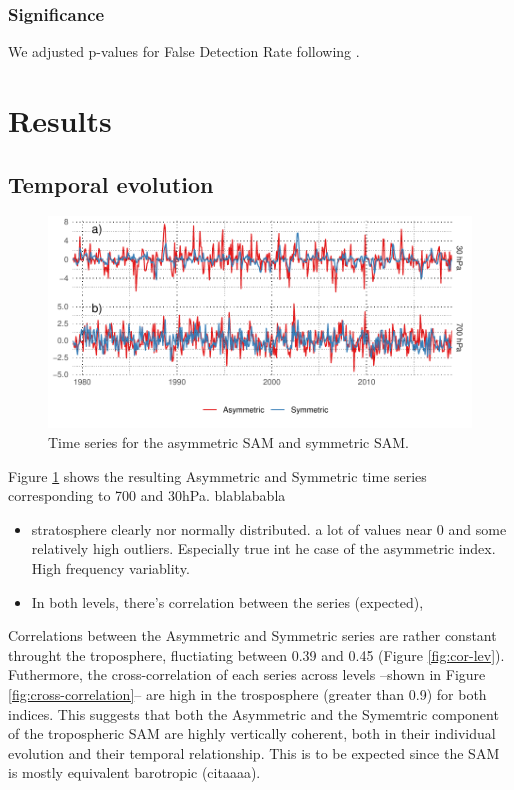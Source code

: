 \documentclass[]{ametsocV5}
\begin{document}
\subsubsection{Significance}

We adjusted p-values for False Detection Rate following
\citet{wilks2016}.

\section{Results}

\subsection{Temporal evolution}

\begin{figure}
\includegraphics{asymsam-timeseries-1} \caption[Time series for the asymmetric SAM and symmetric SAM]{Time series for the asymmetric SAM and symmetric SAM.}\label{fig:asymsam-timeseries}
\end{figure}

Figure \ref{fig:asymsam-timeseries} shows the resulting Asymmetric and
Symmetric time series corresponding to 700 and 30hPa. blablababla

\begin{itemize}
\item
  stratosphere clearly nor normally distributed. a lot of values near 0
  and some relatively high outliers. Especially true int he case of the
  asymmetric index. High frequency variablity.
\item
  In both levels, there's correlation between the series (expected),
\end{itemize}

Correlations between the Asymmetric and Symmetric series are rather
constant throught the troposphere, fluctiating between 0.39 and 0.45
(Figure \ref{fig:cor-lev}). Futhermore, the cross-correlation of each
series across levels --shown in Figure \ref{fig:cross-correlation}-- are
high in the trosposphere (greater than 0.9) for both indices. This
suggests that both the Asymmetric and the Symemtric component of the
tropospheric SAM are highly vertically coherent, both in their
individual evolution and their temporal relationship. This is to be
expected since the SAM is mostly equivalent barotropic (citaaaa).
\end{document}
